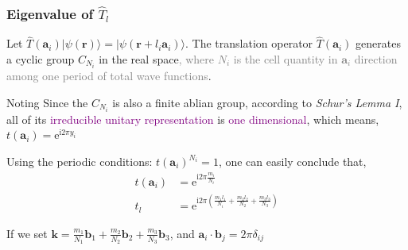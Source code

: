 \documentclass{beamer}
\begin{document}
  \begin{frame}
  \frametitle{Eigenvalue of \(\widehat{T}_l\)}
  
  Let \(\widehat{T}(\mathbf{a}_i) |\psi(\mathbf{r})\rangle = |\psi(\mathbf{r}+l_i\mathbf{a}_i)\rangle\). The translation operator \(\widehat{T}(\mathbf{a}_i)\) generates a cyclic group \(C_{N_i}\) in the real space\textcolor{gray}{, where \(N_i\) is the cell quantity in \(\mathbf{a}_i\) direction among one period of total wave functions}.

  \begin{block}{Noting}
    Since the \(C_{N_i}\) is also a finite ablian group, according to \emph{Schur's Lemma I}, all of its \textcolor{purple}{irreducible unitary representation} is \textcolor{purple}{one dimensional}, which means, \(t(\mathbf{a}_i) = \mathrm{e}^{\mathrm{i}2\pi{}y_i}\)
  \end{block}

  Using the periodic conditions: \(t(\mathbf{a}_i)^{N_i}=1\), one can easily conclude that, 
  \begin{subequations}
    \begin{align}
      t(\mathbf{a}_i) &= \mathrm{e}^{\mathrm{i}2\pi{}\frac{m_i}{N_i}}\\
      t_l &= \mathrm{e}^{\mathrm{i}2\pi{}\left(\frac{m_1l_1}{N_i}+\frac{m_2l_2}{N_2}+\frac{m_3l_3}{N_3}\right)}
    \end{align}
  \end{subequations}

  If we set \(\mathbf{k} = \frac{m_1}{N_1}\mathbf{b}_1+\frac{m_2}{N_2}\mathbf{b}_2+\frac{m_3}{N_3}\mathbf{b}_3\), and \(\mathbf{a}_i\cdot\mathbf{b}_j = 2\pi\delta_{ij}\)

  \end{frame}
\end{document}
